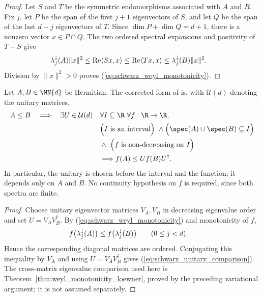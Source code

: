 \begin{proof}
    \leanok
    Let $S$ and $T$ be the symmetric endomorphisms associated with $A$ and
    $B$. Fix $j$, let $P$ be the span of the first $j+1$ eigenvectors of
    $S$, and let $Q$ be the span of the last $d-j$ eigenvectors of $T$.
    Since $\dim P+\dim Q=d+1$, there is a nonzero vector
    $x\in P\cap Q$. The two ordered spectral expansions and positivity of
    $T-S$ give
    \begin{align}
        \lambda_j^\downarrow(A)\lVert x\rVert^2
         & \leq \operatorname{Re}\langle Sx,x\rangle
          \leq \operatorname{Re}\langle Tx,x\rangle
          \leq \lambda_j^\downarrow(B)\lVert x\rVert^2.
        \notag
    \end{align}
    Division by $\lVert x\rVert^2>0$ proves
    (\ref{eq:schwarz_weyl_monotonicity}).
\end{proof}

\begin{theorem}
    \label{thm:wolf_unitary_comparison}
    \leanok
    Let $A,B\in\MN{d}$ be Hermitian. The corrected form of
    \cite[Proposition~5.3 and Equation~(5.57)]{Wolf2012Quantum} is, with
    $\mathcal U(d)$ denoting the unitary matrices,
    \begin{align}
        A\leq B\quad\Longrightarrow\quad
        \exists U\in\mathcal U(d)\quad
        &\forall I\subseteq\R\ \forall f:\R\to\R, \notag\\
        &\Bigl(I\text{ is an interval}\Bigr)\ \land
          \Bigl(\spec(A)\cup\spec(B)\subseteq I\Bigr) \notag\\
        &\land\ \Bigl(f\text{ is non-decreasing on }I\Bigr) \notag\\
        &\Longrightarrow f(A)\leq U f(B)U^\dagger.
        \label{eq:schwarz_unitary_comparison}
    \end{align}
    In particular, the unitary is chosen before the interval and the function;
    it depends only on $A$ and $B$. No continuity hypothesis on $f$ is
    required, since both spectra are finite.
\end{theorem}

\begin{proof}
    \leanok
    Choose unitary eigenvector matrices $V_A,V_B$ in decreasing eigenvalue
    order and set $U=V_AV_B^\dagger$. By
    (\ref{eq:schwarz_weyl_monotonicity}) and monotonicity of $f$,
    \begin{align}
        f\bigl(\lambda_j^\downarrow(A)\bigr)
         &\leq f\bigl(\lambda_j^\downarrow(B)\bigr)
        \qquad (0\leq j<d).
        \notag
    \end{align}
    Hence the corresponding diagonal matrices are ordered. Conjugating this
    inequality by $V_A$ and using $U=V_AV_B^\dagger$ gives
    (\ref{eq:schwarz_unitary_comparison}). The cross-matrix eigenvalue
    comparison used here is Theorem~\ref{thm:weyl_monotonicity_loewner}, proved
    by the preceding variational argument; it is not assumed separately.
\end{proof}

